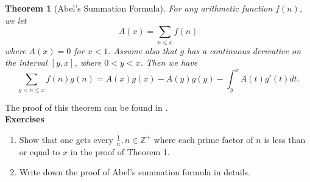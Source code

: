\documentclass[12pt,letterpaper]{book}
\newtheorem{theorem}{Theorem}
\begin{document}
\begin{theorem}[Abel's Summation Formula]\label{1}
For any arithmetic function $f(n)$, we let
\begin{equation*}
A(x)=\sum_{n\leq x}f(n)
\end{equation*}
where $A(x)=0$ for $x<1$.  Assume also that $g$ has a continuous
derivative on the interval $[y,x]$, where $0<y<x$.  Then we have
\begin{equation*}
\sum_{y<n\leq x}f(n)g(n)=A(x)g(x)-A(y)g(y)-\int_y^xA(t)g'(t)dt.
\end{equation*}
\end{theorem}
The proof of this theorem can be found in \cite[Chapter
4]{Apostol}.\\ \textbf{Exercises}
\begin{enumerate}
\item{Show that one gets every $\frac{1}{n},
n\in \mathbb{Z^+}$ where each prime factor of $n$ is less than or
equal to $x$ in the proof of Theorem 1.}\item{Write down the proof
of Abel's summation formula in details.}
\end{enumerate}
\end{document}
